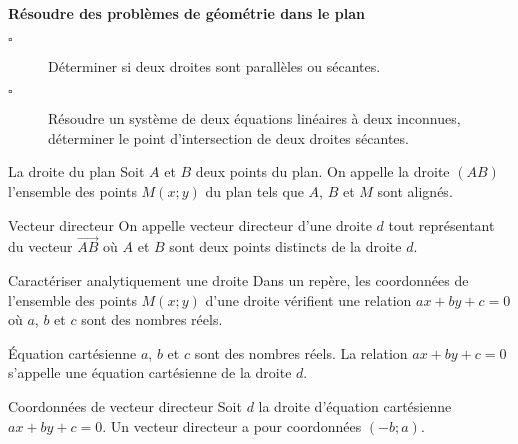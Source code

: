 \begin{titre}

\end{titre}


\begin{CpsCol}
\textbf{Résoudre des problèmes de géométrie dans le plan}
\begin{description}
\item[$\square$] Déterminer si deux droites sont parallèles ou sécantes.
\item[$\square$] Résoudre un système de deux équations linéaires à deux inconnues, déterminer le point d'intersection de deux droites sécantes.
\end{description}
\end{CpsCol}



\begin{DefT}{La droite du plan}
Soit $A$ et $B$ deux points du plan. On appelle la droite $(AB)$ l'ensemble des points $M(x;y)$ du plan  tels que $A$, $B$ et $M$ sont alignés.
\end{DefT}



\begin{DefT}{Vecteur directeur}
On appelle vecteur directeur  d'une droite $d$ tout représentant du vecteur $\overrightarrow{AB}$ où $A$ et $B$ sont deux points distincts de la droite $d$.
\end{DefT}




\begin{ThT}{Caractériser analytiquement une droite}
Dans un repère, les coordonnées de l'ensemble des points $M(x;y)$ d'une droite vérifient une relation $ax+by+c =0$ où $a$, $b$ et $c$ sont des nombres réels.
\end{ThT}



\begin{DefT}{Équation cartésienne}
$a$, $b$ et $c$ sont des nombres réels. La relation $ax+by+c =0$ s'appelle une équation cartésienne  de la droite $d$.
\end{DefT}



\begin{ThT}{Coordonnées de vecteur directeur}
Soit $d$ la droite d'équation cartésienne $ax+by+c =0$. Un vecteur directeur a pour coordonnées $(-b;a)$.
\end{ThT}


